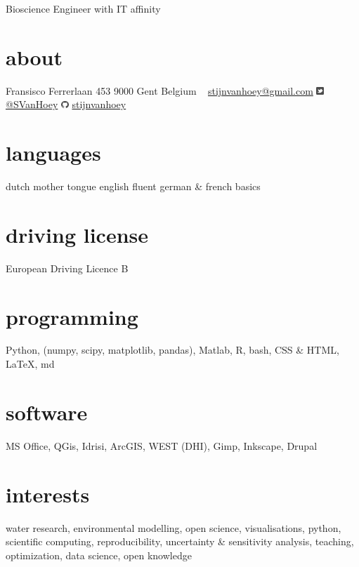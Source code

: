 \documentclass[]{friggeri-cv}  %
\begin{document}
       {Bioscience Engineer with IT affinity}

\begin{aside}
  \section{about}
    Fransisco Ferrerlaan 453
    9000 Gent
    Belgium
    ~
    \href{mailto:stijnvanhoey@gmail.com}{stijnvanhoey@gmail.com}
    	\includegraphics[height=8pt]{twitter.pdf} \href{https://twitter.com/svanhoey}{@SVanHoey}
	\includegraphics[height=8pt]{github.pdf} \href{http://github.com/stijnvanhoey}{stijnvanhoey}%
  \section{languages}
    dutch mother tongue
    english fluent
   german \&  french basics
  \section{driving license}
  European Driving
  Licence B
  \section{programming}
   Python, %
    (numpy, scipy,
    matplotlib, pandas),
    Matlab, R, bash,
    CSS \& HTML,
    \LaTeX, md
  \section{software}
   MS Office,
   QGis, Idrisi, ArcGIS,
   WEST (DHI),
   Gimp, Inkscape,
   Drupal
\end{aside}

\section{interests}

water research, environmental modelling, open science, visualisations, python, scientific computing, reproducibility, uncertainty \& sensitivity analysis, teaching, optimization, data science, open knowledge
\end{document}
